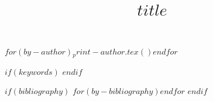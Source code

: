 
\title{$title$}

$for(by-author)$$_print-author.tex()$$endfor$

$if(keywords)$
$endif$

$if(bibliography)$
$for(by-bibliography)$$endfor$
$endif$
